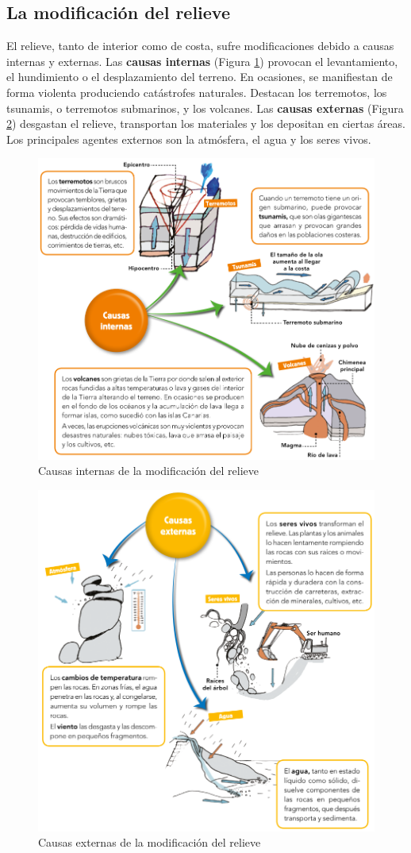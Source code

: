 \subsection{La modificación del relieve}

El relieve, tanto de interior como de costa, sufre modificaciones debido a causas internas y externas. Las \textbf{causas internas} (Figura \ref{fig:causas-internas}) provocan el levantamiento, el hundimiento o el desplazamiento del terreno. En ocasiones, se manifiestan de forma violenta produciendo catástrofes naturales. Destacan los terremotos, los tsunamis, o terremotos submarinos, y los volcanes. Las \textbf{causas externas} (Figura \ref{fig:causas-externas}) desgastan el relieve, transportan los materiales y los depositan en ciertas áreas. Los principales agentes externos son la atmósfera, el agua y los seres vivos.

\begin{figure}[!ht]
    \centering
    \includegraphics[width=0.7\linewidth]{Tema2/05_causas_internas.png}
    \caption{Causas internas de la modificación del relieve}
    \label{fig:causas-internas}
\end{figure}

\begin{figure}[!ht]
    \centering
    \includegraphics[width=0.7\linewidth]{Tema2/06_causas_externas.png}
    \caption{Causas externas de la modificación del relieve}
    \label{fig:causas-externas}
\end{figure}